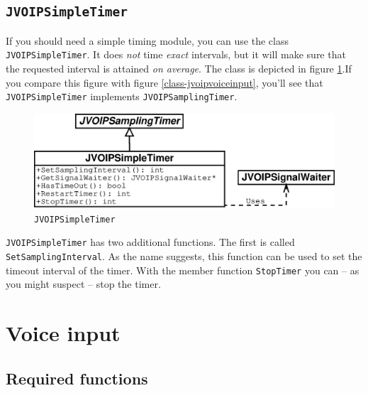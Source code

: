 		\subsection{\tt JVOIPSimpleTimer}
		
		If you should need a simple timing module, you can use the class
		{\tt JVOIPSimpleTimer}. It does {\em not} time {\em exact} intervals, but it
		will make sure that the requested interval is attained {\em on average}.
		The class is depicted in figure \ref{class-jvoipsimpletimer}.If you compare 
		this figure with figure \ref{class-jvoipvoiceinput}, you'll see that
		{\tt JVOIPSimpleTimer} implements {\tt JVOIPSamplingTimer}. 
		\begin{figure}
			\center
			\includegraphics[width=0.7\linewidth]{images/manual/chapter4/class-jvoipsimpletimer.eps}
			\caption{\tt JVOIPSimpleTimer}
			\label{class-jvoipsimpletimer}
		\end{figure}
		
		{\tt JVOIPSimpleTimer} has two additional functions. The first is called
		{\tt Set\-Sampling\-In\-ter\-val}. As the name suggests, this function can be used
		to set the timeout interval of the timer. With the member function 
		{\tt StopTimer} you can -- as you might suspect -- stop the timer.
	
	\section{Voice input}
	
		\subsection{Required functions}
		
